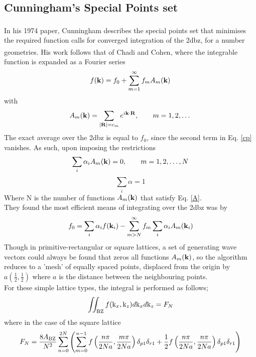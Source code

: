 \documentclass[a4paper, 12pt]{article}
\begin{document}
	\subsection{Cunningham's Special Points set}\label{points}
	In his 1974 paper\textcolor{blue}{\textsuperscript{\cite{CP}}}, Cunningham describes the special points set that minimises the required function calls for converged integration of the \gls{2dbz}, for a number geometries. His work follows that of Chadi and Cohen\textcolor{blue}{\textsuperscript{\cite{CC}}}, where the integrable function is expanded as a Fourier series
	\begin{equation}\label{cp}
		f({\bf k})=f_0 +\sum_{m=1}^\infty f_m A_m({\bf k})
	\end{equation}
	with
	\begin{equation}
		A_m({\bf k})=\sum_{|{\bf R}|=c_m}e^{i\bf k \cdot R},\qquad m=1,2,\dots
	\end{equation}
	The exact average over the \gls{2dbz} is equal to $f_0$, since the second term in Eq. \eqref{cp} vanishes. As such, upon imposing the restrictions
	\begin{equation}\label{A}
		\sum_i \alpha_i A_m({\bf k})=0, \qquad m = 1,2,\dots,N 
	\end{equation}
	\begin{equation}
	\sum_i \alpha = 1	
	\end{equation}
	Where N is the number of functions $A_m({\bf k})$ that satisfy Eq. \eqref{A}.\\
	They found the most efficient means of integrating over the \gls{2dbz} was by
	\begin{equation}
		f_0 = \sum_i \alpha_i f({\bf k}_i) - \sum_{m> N}^\infty f_m \sum_i \alpha_i A_m({\bf k}_i)
	\end{equation}
	Though in primitive-rectangular or square lattices, a set of generating wave vectors could always be found that zeros all functions $A_m({\bf k})$, so the algorithm reduces to a 'mesh' of equally spaced points, displaced from the origin by $a(\frac{1}{2},\frac{1}{2})$ where $a$ is the distance between the neighbouring points.
	\\[2mm] For these simple lattice types, the integral is performed as follows;
	\begin{equation}
		\iint_{\rm BZ}f({\rm k}_x, {\rm k}_z) d{\rm k}_xd{\rm k}_z= F_N
	\end{equation}
	where in the case of the square lattice
	\begin{equation}\label{CPsquare}
		F_N =\frac{8A_{\rm BZ}}{N^2}\sum_{n=0}^{2N}\left(\sum_{m=0}^{n-1} f\left(\frac{n\pi}{2Na}, \frac{m\pi}{2Na}\right)\delta_{p 1}\delta_{r 1}+\frac{1}{2}f\left(\frac{n\pi}{2Na}, \frac{n\pi}{2Na}\right)\delta_{p 1}\delta_{r 1}\right)
	\end{equation}
\end{document}

